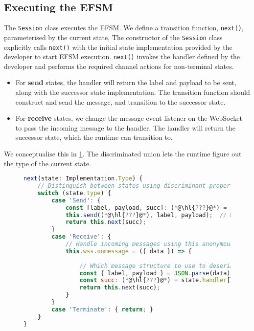 \subsection{Executing the EFSM}
\label{subsection:noderuntimeprivate}

The \texttt{Session} class executes the EFSM.
We define a transition function, \texttt{next()}, 
parameterised by the current state,
The constructor of the \texttt{Session} class
explicitly calls \texttt{next()} with the 
initial state implementation provided by the developer
to start EFSM execution.
\texttt{next()} invokes the handler defined by the developer
and performs the required channel actions for non-terminal states.

\begin{itemize}
\item 
For \textbf{send} states, the handler will
return the label and payload to be sent, along with the
successor state implementation. The transition function
should construct and send the message, 
and transition to the successor state.

\item
For \textbf{receive} states, we change the
message event listener on the WebSocket to
pass the incoming message to the handler.
The handler will return the successor state,
which the runtime can transition to.

\end{itemize}

We conceptualise this in \cref{lst:noderuntimesimple}.
The discriminated union lets the runtime figure out
the type of the current state.

\begin{figure}[!h]
\begin{lstlisting}[language=javascript,tabsize=2]
next(state: Implementation.Type) {
	// Distinguish between states using discriminant property
	switch (state.type) {
		case 'Send': {
			const [label, payload, succ]: (*@\hl{???}@*) = state.handler;	 (*@\label{line:noderuntimebadtype1}@*)
			this.send((*@\hl{???}@*), label, payload);	// Who to send to? (*@\label{line:noderuntimeunknownrole}@*)		
			return this.next(succ);
		}
		case 'Receive': {
			// Handle incoming messages using this anonymous function
			this.wss.onmessage = ({ data }) => {
			
				// Which message structure to use to deserialise?
				const { label, payload } = JSON.parse(data) as (*@\hl{???}@*); (*@\label{line:noderuntimebadtype2}@*)
				const succ: (*@\hl{???}@*) = state.handler[label](...payload); (*@\label{line:noderuntimebadtype3}@*)
				return this.next(succ);
			}
		}
		case 'Terminate': { return; }
	}
}
\end{lstlisting}
\label{lst:noderuntimesimple}
\end{figure}

